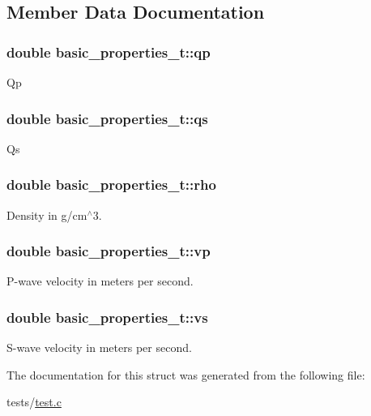 \subsection{Member Data Documentation}
\hypertarget{structbasic__properties__t_a054b74822167020ca2aed30f51950b11}{
\subsubsection[{qp}]{\setlength{\rightskip}{0pt plus 5cm}double basic\+\_\+properties\+\_\+t\+::qp}}\label{structbasic__properties__t_a054b74822167020ca2aed30f51950b11}
Qp \hypertarget{structbasic__properties__t_aab9070f4f1be66487a650dee9d1b1e81}{
\subsubsection[{qs}]{\setlength{\rightskip}{0pt plus 5cm}double basic\+\_\+properties\+\_\+t\+::qs}}\label{structbasic__properties__t_aab9070f4f1be66487a650dee9d1b1e81}
Qs \hypertarget{structbasic__properties__t_a0a1c90d22328a93da73bb44362667f84}{
\subsubsection[{rho}]{\setlength{\rightskip}{0pt plus 5cm}double basic\+\_\+properties\+\_\+t\+::rho}}\label{structbasic__properties__t_a0a1c90d22328a93da73bb44362667f84}
Density in g/cm$^\wedge$3. \hypertarget{structbasic__properties__t_a5162d2a7d7f991c1a67a94abf947b054}{
\subsubsection[{vp}]{\setlength{\rightskip}{0pt plus 5cm}double basic\+\_\+properties\+\_\+t\+::vp}}\label{structbasic__properties__t_a5162d2a7d7f991c1a67a94abf947b054}
P-\/wave velocity in meters per second. \hypertarget{structbasic__properties__t_a8856e1899a2cab207b667d7f1300ab84}{
\subsubsection[{vs}]{\setlength{\rightskip}{0pt plus 5cm}double basic\+\_\+properties\+\_\+t\+::vs}}\label{structbasic__properties__t_a8856e1899a2cab207b667d7f1300ab84}
S-\/wave velocity in meters per second. 

The documentation for this struct was generated from the following file\+:\begin{DoxyCompactItemize}
\item 
tests/\hyperlink{test_8c}{test.\+c}\end{DoxyCompactItemize}
